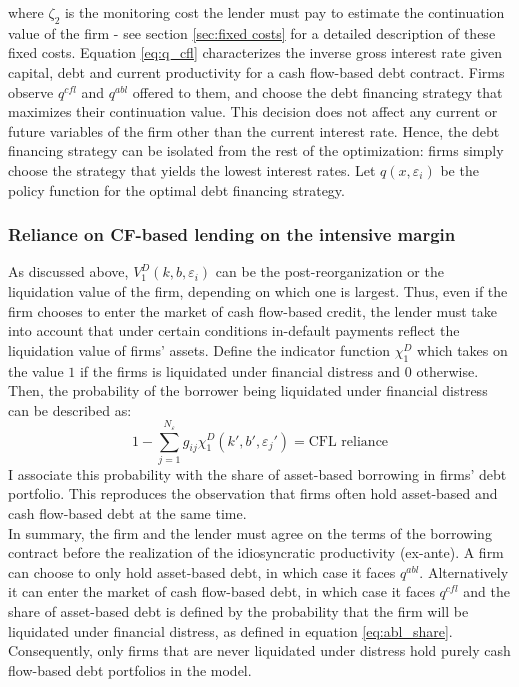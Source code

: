 \documentclass[12pt]{article}
\begin{document}
where $\zeta_2$ is the monitoring cost the lender must pay to estimate the continuation value of the firm - see section \ref{sec:fixed costs} for a detailed description of these fixed costs. Equation \ref{eq:q_cfl} characterizes the inverse gross interest rate given capital, debt and current productivity for a cash flow-based debt contract. Firms observe $q^{cfl}$ and $q^{abl}$ offered to them, and choose the debt financing strategy that maximizes their continuation value. This decision does not affect any current or future variables of the firm other than the current interest rate. Hence, the debt financing strategy can be isolated from the rest of the optimization: firms simply choose the strategy that yields the lowest interest rates. Let $q(x,\varepsilon_i)$ be the policy function for the optimal debt financing strategy. 
\subsubsection{Reliance on CF-based lending on the intensive margin}
As discussed above, $V_1^D(k,b,\varepsilon_i)$ can be the post-reorganization or the liquidation value of the firm, depending on which one is largest. Thus, even if the firm chooses to enter the market of cash flow-based credit, the lender must take into account that under certain conditions in-default payments reflect the liquidation value of firms' assets. Define the indicator function $\chi_1^D$ which takes on the value $1$ if the firms is liquidated under financial distress and 0 otherwise. Then, the probability of the borrower being liquidated under financial distress can be described as: 
\begin{equation} \label{eq:abl_share}
1 - \sum_{j = 1}^{N_\varepsilon} g_{ij} \chi_1^D(k',b',\varepsilon_j') = \text{CFL reliance}
\end{equation}
I associate this probability with the share of asset-based borrowing in firms' debt portfolio. This reproduces the observation that firms often hold asset-based and cash flow-based debt at the same time. \vspace{3mm} \\
In summary, the firm and the lender must agree on the terms of the borrowing contract before the realization of the idiosyncratic productivity (ex-ante). A firm can choose to only hold asset-based debt, in which case it faces $q^{abl}$. Alternatively it can enter the market of cash flow-based debt, in which case it faces $q^{cfl}$ and the share of asset-based debt is defined by the probability that the firm will be liquidated under financial distress, as defined in equation \ref{eq:abl_share}. Consequently, only firms that are never liquidated under distress hold purely cash flow-based debt portfolios in the model. 
\end{document}
